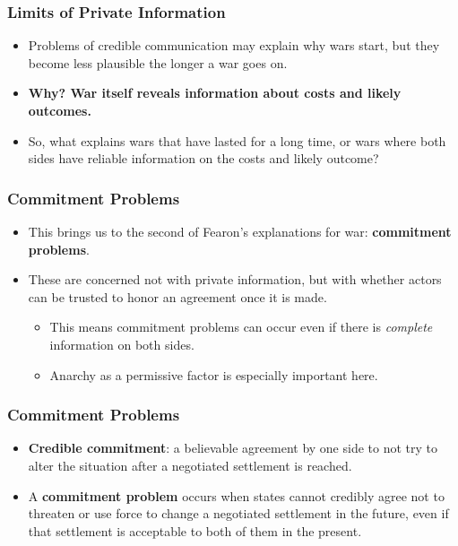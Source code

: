 \documentclass[handout]{beamer}
\begin{document}
\begin{frame} 
	\frametitle{\LARGE{Limits of Private Information}}
	\begin{itemize}
		\item Problems of credible communication may explain why wars start, but they become less plausible the longer a war goes on. \pause
		\item \textbf{Why? War itself reveals information about costs and likely outcomes.} \pause
		\item So, what explains wars that have lasted for a long time, or wars where both sides have reliable information on the costs and likely outcome?
	\end{itemize}
\end{frame}

\begin{frame} 
	\frametitle{\LARGE{Commitment Problems}}
	\begin{itemize}
		\item This brings us to the second of Fearon's explanations for war: \textbf{commitment problems}. \pause
		\item These are concerned not with private information, but with whether actors can be trusted to honor an agreement once it is made. \pause
		\begin{itemize}
			\item This means commitment problems can occur even if there is \textit{complete} information on both sides. \pause
			\item Anarchy as a permissive factor is especially important here.
		\end{itemize}
	\end{itemize}
\end{frame}

\begin{frame} 
	\frametitle{\LARGE{Commitment Problems}}
	\begin{itemize}
		\item \textbf{Credible commitment}: a believable agreement by one side to not try to alter the situation after a negotiated settlement is reached. \pause 
		\item A \textbf{commitment problem} occurs when states cannot credibly agree not to threaten or use force to change a negotiated settlement in the future, even if that settlement is acceptable to both of them in the present.
	\end{itemize}
\end{frame}
\end{document}
